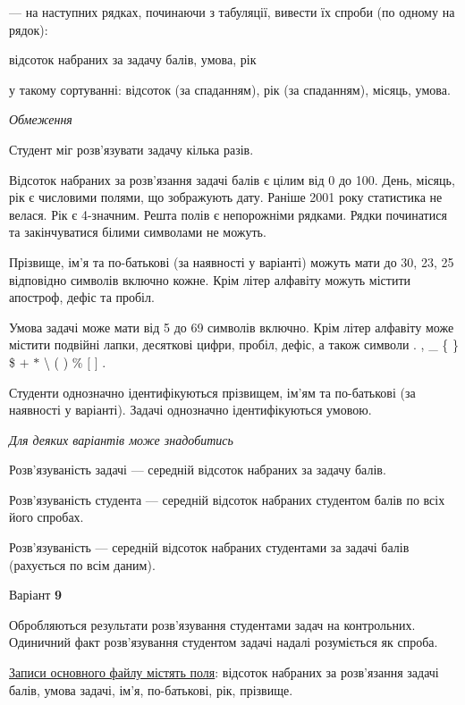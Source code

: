 \documentclass[11pt, ukrainian]{article}
\begin{document}
{\noindent}--- на наступних рядках, починаючи з табуляції, вивести їх спроби (по одному на рядок):\par
відсоток набраних за задачу балів, умова, рік

{\noindent}у такому сортуванні: відсоток (за спаданням), рік (за спаданням), місяць, умова.


\bigskip\textit{Обмеження}

Студент міг розв’язувати задачу кілька разів.

Відсоток набраних за розв’язання задачі балів є цілим від 0 до 100.
День, місяць, рік є числовими полями, що зображують дату.
Раніше 2001 року статистика не велася. Рік є 4-значним.
Решта полів є непорожніми рядками.
Рядки починатися та закінчуватися білими символами не можуть.

Прізвище, ім’я та по-батькові (за наявності у варіанті) можуть мати до 30, 23, 25 відповідно символів включно кожне. 
Крім літер алфавіту можуть містити апостроф, дефіс та пробіл.

Умова задачі може мати від 5 до 69 символів включно.
Крім літер алфавіту може містити подвійні лапки, десяткові цифри, пробіл, дефіс,
а також символи . , \_ \{ \} \$ $+$ $*$ {\textbackslash} ( ) \% $[$ $]$ .

Студенти однозначно ідентифікуються прізвищем, ім’ям та по-батькові (за наявності у варіанті).
Задачі однозначно ідентифікуються умовою.

\bigskip\textit{Для деяких варіантів може знадобитись}

Розв'язуваність задачі --- середній відсоток набраних за задачу балів.

Розв'язуваність студента --- середній відсоток набраних студентом балів по всіх його спробах.

Розв'язуваність --- середній відсоток набраних студентами за задачі балів (рахується по всім даним).


\par
\newpage
{\center Варіант  \No \textbf { 9 }\par}
\bigskip
Обробляються результати розв’язування студентами задач на контрольних.
Одиничний факт роз\-в’я\-зу\-вання студентом задачі надалі розуміється як спроба.

\underline{Записи основного файлу містять поля}: відсоток набраних за розв’язання задачі балів, умова задачі, ім’я, по-батькові, рік, прізвище.
\end{document}
